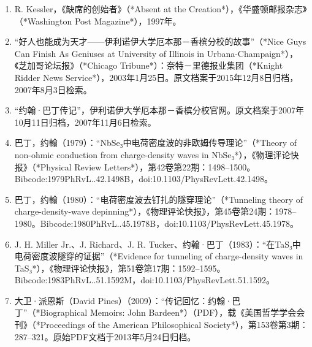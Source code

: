 \begin{enumerate}
\item R. Kessler，《缺席的创始者》（*Absent at the Creation*），《华盛顿邮报杂志》（*Washington Post Magazine*），1997年。

\item “好人也能成为天才——伊利诺伊大学厄本那－香槟分校的故事”（*Nice Guys Can Finish As Geniuses at University of Illinois in Urbana-Champaign*），《芝加哥论坛报》（*Chicago Tribune*）：奈特－里德报业集团（*Knight Ridder News Service*），2003年1月25日。原文档案于2015年12月8日归档，2007年8月3日检索。

\item “约翰·巴丁传记”，伊利诺伊大学厄本那－香槟分校官网。原文档案于2007年10月11日归档，2007年11月6日检索。

\item 巴丁，约翰（1979）：“NbSe₃中电荷密度波的非欧姆传导理论”（*Theory of non-ohmic conduction from charge-density waves in NbSe₃*），《物理评论快报》（*Physical Review Letters*），第42卷第22期：1498–1500。Bibcode:1979PhRvL..42.1498B，doi:10.1103/PhysRevLett.42.1498。

\item 巴丁，约翰（1980）：“电荷密度波去钉扎的隧穿理论”（*Tunneling theory of charge-density-wave depinning*），《物理评论快报》，第45卷第24期：1978–1980。Bibcode:1980PhRvL..45.1978B，doi:10.1103/PhysRevLett.45.1978。

\item J. H. Miller Jr.、J. Richard、J. R. Tucker、约翰·巴丁（1983）：“在TaS₃中电荷密度波隧穿的证据”（*Evidence for tunneling of charge-density waves in TaS₃*），《物理评论快报》，第51卷第17期：1592–1595。Bibcode:1983PhRvL..51.1592M，doi:10.1103/PhysRevLett.51.1592。

\item 大卫·派恩斯（David Pines）（2009）：“传记回忆：约翰·巴丁”（*Biographical Memoirs: John Bardeen*）（PDF），载《美国哲学学会会刊》（*Proceedings of the American Philosophical Society*），第153卷第3期：287–321。原始PDF文档于2013年5月24日归档。


\end{enumerate}
